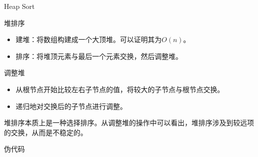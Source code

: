\documentclass{ldr-simple-gray}
\begin{document}
  \begin{frame}{Heap Sort}
    \begin{block}{堆排序}
      \begin{itemize}
        \item 建堆：将数组构建成一个大顶堆。可以证明其为$O(n)$。
        \item 排序：将堆顶元素与最后一个元素交换，然后调整堆。
      \end{itemize}
    \end{block}
    \begin{block}{调整堆}
      \begin{itemize}
        \item 从根节点开始比较左右子节点的值，将较大的子节点与根节点交换。
        \item 递归地对交换后的子节点进行调整。
      \end{itemize}
    \end{block}
    堆排序本质上是一种选择排序。从调整堆的操作中可以看出，堆排序涉及到较远项的交换，从而是不稳定的。
  \end{frame}

  \begin{frame}{伪代码}
    \begin{algorithm}[H]
      \caption{Heap Sort}
      \begin{algorithmic}[1]
        \ENDFOR
      \end{algorithmic}
    \end{algorithm}

    \begin{algorithm}[H]
      \caption{Build Heap}
      \begin{algorithmic}[1]
        \ENDFOR
      \end{algorithmic}
    \end{algorithm}
  \end{frame}
\end{document}
